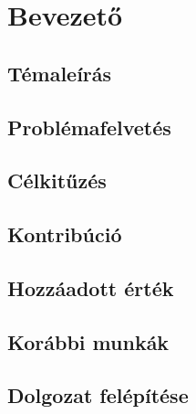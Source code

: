 \chapter{Bevezető} 

\section{Témaleírás}


\section{Problémafelvetés}


\section{Célkitűzés}

\section{Kontribúció}

\section{Hozzáadott érték}

\section{Korábbi munkák}

\section{Dolgozat felépítése}
